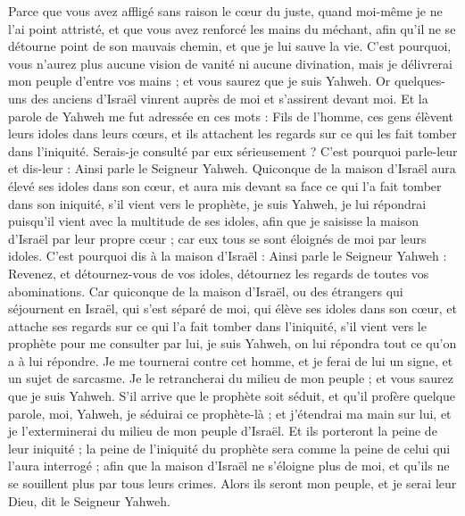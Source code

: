 \begin{multicols}{2}
Parce que vous avez affligé sans raison le cœur du juste, quand moi-même je ne l'ai point attristé, et que vous avez renforcé les mains du méchant, afin qu'il ne se détourne point de son mauvais chemin, et que je lui sauve la vie.
C'est pourquoi, vous n'aurez plus aucune vision de vanité ni aucune divination, mais je délivrerai mon peuple d'entre vos mains ; et vous saurez que je suis Yahweh.
\VerseOne{}Or quelques-uns des anciens d'Israël vinrent auprès de moi et s'assirent devant moi.
Et la parole de Yahweh me fut adressée en ces mots :
Fils de l'homme, ces gens élèvent leurs idoles dans leurs cœurs, et ils attachent les regards sur ce qui les fait tomber dans l'iniquité. Serais-je consulté par eux sérieusement ?
C'est pourquoi parle-leur et dis-leur : Ainsi parle le Seigneur Yahweh. Quiconque de la maison d'Israël aura élevé ses idoles dans son cœur, et aura mis devant sa face ce qui l'a fait tomber dans son iniquité, s'il vient vers le prophète, je suis Yahweh, je lui répondrai puisqu'il vient avec la multitude de ses idoles,
afin que je saisisse la maison d'Israël par leur propre cœur ; car eux tous se sont éloignés de moi par leurs idoles.
C'est pourquoi dis à la maison d'Israël : Ainsi parle le Seigneur Yahweh : Revenez, et détournez-vous de vos idoles, détournez les regards de toutes vos abominations.
Car quiconque de la maison d'Israël, ou des étrangers qui séjournent en Israël, qui s'est séparé de moi, qui élève ses idoles dans son cœur, et attache ses regards sur ce qui l'a fait tomber dans l'iniquité, s'il vient vers le prophète pour me consulter par lui, je suis Yahweh, on lui répondra tout ce qu'on a à lui répondre.
Je me tournerai contre cet homme, et je ferai de lui un signe, et un sujet de sarcasme. Je le retrancherai du milieu de mon peuple ; et vous saurez que je suis Yahweh.
S'il arrive que le prophète soit séduit, et qu'il profère quelque parole, moi, Yahweh, je séduirai ce prophète-là ; et j'étendrai ma main sur lui, et je l'exterminerai du milieu de mon peuple d'Israël.
Et ils porteront la peine de leur iniquité ; la peine de l'iniquité du prophète sera comme la peine de celui qui l'aura interrogé ;
afin que la maison d'Israël ne s'éloigne plus de moi, et qu'ils ne se souillent plus par tous leurs crimes. Alors ils seront mon peuple, et je serai leur Dieu, dit le Seigneur Yahweh.

\end{multicols}
